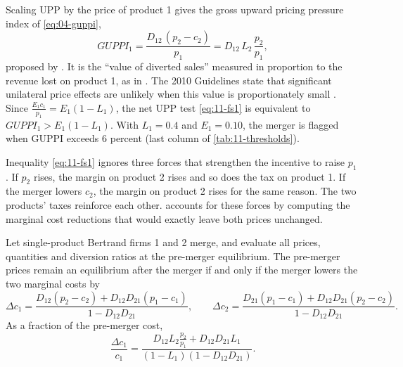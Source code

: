  Scaling UPP by the price of product 1 gives the gross upward pricing pressure index of
\eqref{eq:04-guppi},
\begin{equation}\label{eq:11-guppi}
  \mathit{GUPPI}_1 = \frac{D_{12}\,(p_2 - c_2)}{p_1} = D_{12}\, L_2\, \frac{p_2}{p_1} ,
\end{equation}
proposed by \citet{SalopMoresi2009}. It is the ``value of diverted sales'' measured in proportion to the revenue lost on
product 1, as in \citet[n.~11]{USDOJFTC2010}. The 2010 Guidelines state that significant unilateral price effects are
unlikely when this value is proportionately small \citep[Section~6.1]{USDOJFTC2010}.
Since $\frac{E_1 c_1}{p_1} = E_1(1 - L_1)$, the net UPP test
\eqref{eq:11-fs1} is equivalent to $\mathit{GUPPI}_1 > E_1(1 - L_1)$. With $L_1 = 0.4$ and $E_1 = 0.10$, the merger is
flagged when GUPPI exceeds 6 percent (last column of \cref{tab:11-thresholds}).

 Inequality \eqref{eq:11-fs1} ignores three forces that strengthen the incentive to raise
$p_1$ \citep[Section 2.E]{FarrellShapiro2010}. If $p_2$ rises, the margin on product 2 rises and so does the tax on
product 1. If the merger lowers $c_2$, the margin on product 2 rises for the same reason. The two products' taxes
reinforce each other. \citet{Werden1996} accounts for these forces by computing the marginal cost reductions that
would exactly leave both prices unchanged.

\begin{proposition}\label{prop:11-cmcr}
Let single-product Bertrand firms 1 and 2 merge, and evaluate all prices, quantities and diversion ratios at the
pre-merger equilibrium. The pre-merger prices remain an equilibrium after the merger if and only if the merger lowers
the two marginal costs by
\begin{equation}\label{eq:11-cmcr}
  \Delta c_1 = \frac{D_{12}(p_2 - c_2) + D_{12}D_{21}(p_1 - c_1)}{1 - D_{12}D_{21}} , \qquad
  \Delta c_2 = \frac{D_{21}(p_1 - c_1) + D_{12}D_{21}(p_2 - c_2)}{1 - D_{12}D_{21}} .
\end{equation}
As a fraction of the pre-merger cost,
\begin{equation}\label{eq:11-cmcr-frac}
  \frac{\Delta c_1}{c_1} = \frac{D_{12} L_2 \frac{p_2}{p_1} + D_{12}D_{21}L_1}{(1 - L_1)(1 - D_{12}D_{21})} .
\end{equation}
\end{proposition}


